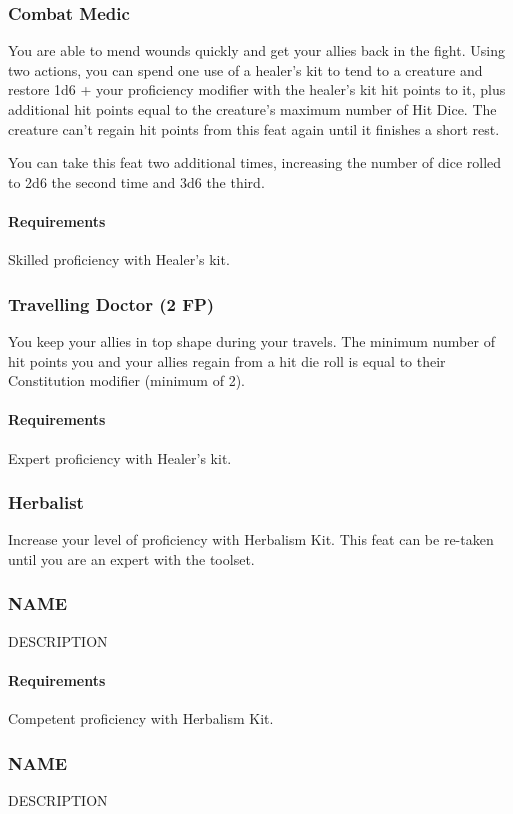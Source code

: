 \subsubsection{Combat Medic} \label{feat::combatmedic}
    You are able to mend wounds quickly and get your allies back in the fight.
    Using two actions, you can spend one use of a healer's kit to tend to a creature and restore 1d6 + your proficiency modifier with the healer's kit hit points to it, plus additional hit points equal to the creature's maximum number of Hit Dice.
    The creature can't regain hit points from this feat again until it finishes a short rest.

    You can take this feat two additional times, increasing the number of dice rolled to 2d6 the second time and 3d6 the third.
    \paragraph{Requirements} Skilled proficiency with Healer's kit.
\subsubsection{Travelling Doctor (2 FP)} \label{feat::travellingdoctor}
    You keep your allies in top shape during your travels.
    The minimum number of hit points you and your allies regain from a hit die roll is equal to their Constitution modifier (minimum of 2).
    \paragraph{Requirements} Expert proficiency with Healer's kit.
\subsubsection{Herbalist} \label{feat::herbalist}
    Increase your level of proficiency with Herbalism Kit.
    This feat can be re-taken until you are an expert with the toolset.
\subsubsection{NAME} \label{feat::name}
    DESCRIPTION
    \paragraph{Requirements} Competent proficiency with Herbalism Kit.
\subsubsection{NAME} \label{feat::name}
    DESCRIPTION %
